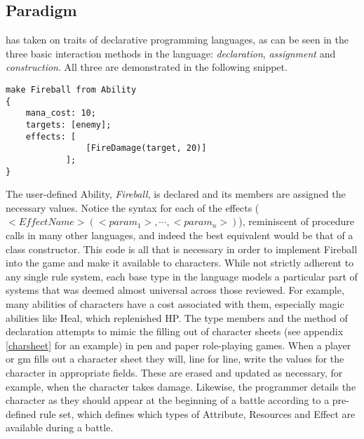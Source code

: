 \subsection{Paradigm}
\label{language:paradigm}
\langname{} has taken on traits of declarative programming languages, as can be seen in the three basic interaction methods in the language: \emph{declaration}, \emph{assignment} and \emph{construction}.
All three are demonstrated in the following snippet. %

\begin{lstlisting}[language=fflang]
make Fireball from Ability
{
	mana_cost: 10;
	targets: [enemy];
	effects: [
				[FireDamage(target, 20)]
			];
}
\end{lstlisting}

The user-defined Ability, \emph{Fireball}, is declared and its members are assigned the necessary values. Notice the syntax for each of the effects ($<EffectName>(<param_1>, \cdots ,<param_n>)$), reminiscent of procedure calls in many other languages, and indeed the best equivalent would be that of a class constructor. This code is all that is necessary in order to implement Fireball into the game and make it available to characters.
While not strictly adherent to any single rule system, each base type in the language models a particular part of systems that was deemed almost universal across those reviewed. For example, many abilities of characters have a cost associated with them, especially magic abilities like Heal, which replenished HP. %
The type members and the method of declaration attempts to mimic the filling out of character sheets (see appendix \vref{charsheet} for an example) in pen and paper role-playing games. When a player or \ac{gm} fills out a character sheet they will, line for line, write the values for the character in appropriate fields. These are erased and updated as necessary, for example, when the character takes damage.
Likewise, the programmer details the character as they should appear at the beginning of a battle according to a pre-defined rule set, which defines which types of Attribute, Resources and Effect are available during a battle.
